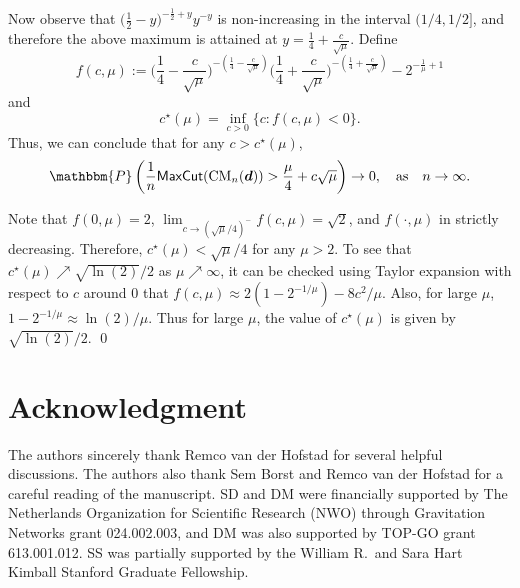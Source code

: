 \documentclass[11pt,a4paper, reqno]{article}
\numberwithin{equation}{section}
\numberwithin{equation}{section}
\newcommand{\prob}[1]{\ensuremath{\mathbbm{P}\left(#1\right)}}
\newcommand{\1}{\ensuremath{\mathbbm{1}}}
\newcommand{\CM}{\ensuremath{\mathrm{CM}_n(\boldsymbol{d})}}
\newcommand{\Mcut}{{\sf{MaxCut}}}
\numberwithin{equation}{section}
\numberwithin{theorem}{section}
\begin{document}
Now observe that $\big(\frac{1}{2}-y\big)^{-\frac{1}{2}+y}y^{-y}$ is non-increasing in the interval $\big(1/4,1/2]$, and therefore the above maximum is attained at $y=  \frac{1}{4} + \frac{c}{\sqrt{\mu}}$.
Define 
$$f(c,\mu):=\Big(\frac{1}{4}-\frac{c}{\sqrt{\mu}}\Big)^{-\left(\frac{1}{4}-\frac{c}{\sqrt{\mu}}\right)}\Big(\frac{1}{4}+\frac{c}{\sqrt{\mu}}\Big)^{-\left(\frac{1}{4}+\frac{c}{\sqrt{\mu}}\right)}-2^{-\frac{1}{\mu}+1} $$
and
\begin{equation}\label{eq:cstarmu}
c^\star(\mu)=\inf_{c>0}\Big\{c: f(c,\mu)<0 \Big\}.
\end{equation}
Thus, we can conclude that for any $c>c^\star(\mu)$,
$$\prob{\frac{1}{n}\Mcut(\CM)>\frac{\mu}{4}+c\sqrt{\mu}}\to 0,\quad \text{as}\quad n\to\infty.$$

\noindent
Note that $f(0,\mu) = 2$, $\lim_{c\to (\sqrt{\mu}/4)^-}f(c,\mu) = \sqrt{2}$, and $f(\cdot,\mu)$ in strictly decreasing. Therefore, $c^\star(\mu)<\sqrt{\mu}/4$ for any $\mu>2$.
To see that $c^\star(\mu)\nearrow \sqrt{\ln(2)}/2$ as $\mu\nearrow\infty$, it can be checked using Taylor expansion with respect to $c$ around 0 that
$f(c,\mu) \approx 2(1-2^{-1/\mu})-8c^2/\mu$.
Also, for large $\mu$, $1-2^{-1/\mu}\approx \ln(2)/\mu$.
Thus for large $\mu$, the value of $c^\star(\mu)$ is given by $\sqrt{\ln(2)}/2$.
\qed


{%
\section*{Acknowledgment}
The authors sincerely thank Remco van der Hofstad for several helpful discussions.
The authors also thank Sem Borst and Remco van der Hofstad for a careful reading of the manuscript.
SD and DM were financially supported by The Netherlands Organization for Scientific Research (NWO) through Gravitation Networks grant 024.002.003, and DM was also supported by TOP-GO grant 613.001.012. SS was partially supported by the William R.~and Sara Hart Kimball Stanford Graduate Fellowship. 





}
\end{document}
